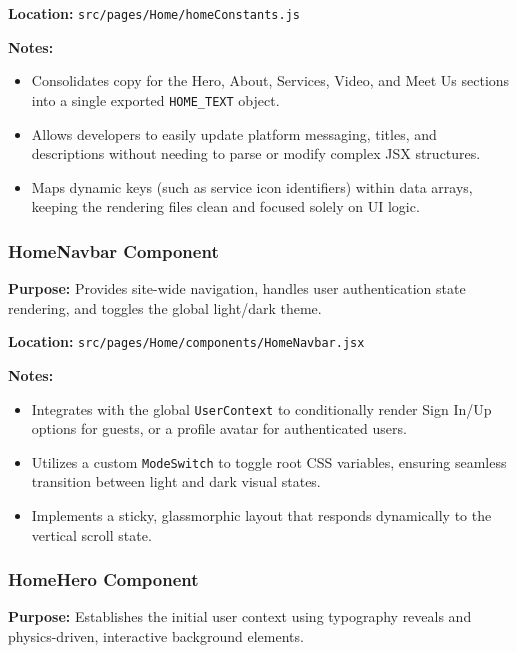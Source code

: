 \vspace{0.2cm}
\noindent\textbf{Location:} \texttt{src/pages/Home/homeConstants.js}

\vspace{0.2cm}
\noindent\textbf{Notes:}
\begin{itemize}
    \item Consolidates copy for the Hero, About, Services, Video, and Meet Us sections into a single exported \texttt{HOME\_TEXT} object.
    \item Allows developers to easily update platform messaging, titles, and descriptions without needing to parse or modify complex JSX structures.
    \item Maps dynamic keys (such as service icon identifiers) within data arrays, keeping the rendering files clean and focused solely on UI logic.
\end{itemize}

\subsubsection{HomeNavbar Component}

\textbf{Purpose:} Provides site-wide navigation, handles user authentication state rendering, and toggles the global light/dark theme.

\vspace{0.2cm}
\noindent\textbf{Location:} \texttt{src/pages/Home/components/HomeNavbar.jsx}

\vspace{0.2cm}
\noindent\textbf{Notes:}
\begin{itemize}
    \item Integrates with the global \texttt{UserContext} to conditionally render Sign In/Up options for guests, or a profile avatar for authenticated users.
    \item Utilizes a custom \texttt{ModeSwitch} to toggle root CSS variables, ensuring seamless transition between light and dark visual states.
    \item Implements a sticky, glassmorphic layout that responds dynamically to the vertical scroll state.
\end{itemize}

\subsubsection{HomeHero Component}

\textbf{Purpose:} Establishes the initial user context using typography reveals and physics-driven, interactive background elements.

